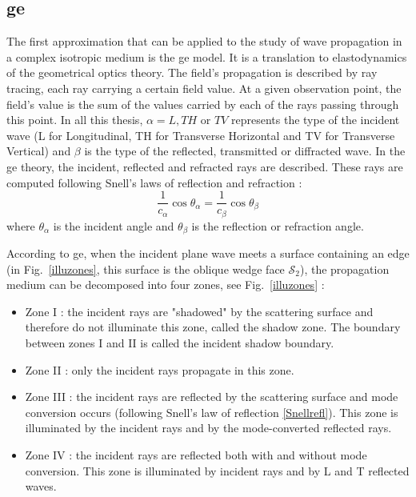 \subsection{\acrfull{ge}}
\label{sectGE}
The first approximation that can be applied to the study of wave propagation in a complex isotropic medium is the \acrfull{ge} model. It is a translation to elastodynamics of the geometrical optics theory. The field's propagation is described by ray tracing, each ray carrying a certain field value. At a given observation point, the field's value is the sum of the values carried by each of the rays passing through this point. In all this thesis, $\alpha=L,TH$ or $TV$ represents the type of the incident wave (L for Longitudinal, TH for Transverse Horizontal and TV for Transverse Vertical) and $\beta$ is the type of the reflected, transmitted or diffracted wave. In the \acrshort{ge} theory, the incident, reflected and refracted rays are described. These rays are computed following Snell's laws of reflection and refraction :
\begin{equation}
    \frac{1}{c_{\alpha}}\cos\theta_{\alpha} = \frac{1}{c_{\beta}} \cos\theta_{\beta}
    \label{Snellrefl}
\end{equation}
where $\theta_{\alpha}$ is the incident angle and $\theta_{\beta}$ is the reflection or refraction angle.

According to \acrshort{ge}, when the incident plane wave meets a surface containing an edge (in Fig.~\ref{illuzones}, this surface is the oblique wedge face $\mathcal{S}_2$), the propagation medium can be decomposed into four zones, see Fig.~\ref{illuzones} :
\begin{itemize}
	\item Zone I : the incident rays are "shadowed" by the scattering surface and therefore do not illuminate this zone, called the shadow zone. The boundary between zones I and II is called the incident shadow boundary.
    \item Zone II : only the incident rays propagate in this zone.
    \item Zone III :  the incident rays are reflected by the scattering surface and mode conversion occurs (following Snell's law of reflection \eqref{Snellrefl}). This zone is illuminated by the incident rays and by the mode-converted reflected rays.
    \item Zone IV : the incident rays are reflected both with and without mode conversion. This zone is illuminated by incident rays and by L and T reflected waves.
\end{itemize}

